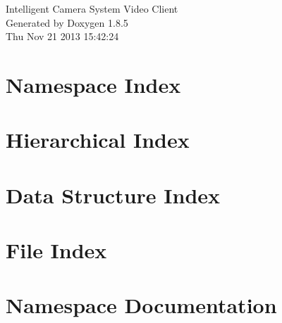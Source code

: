 \documentclass[twoside]{book}
\newcommand{\clearemptydoublepage}{%
  \newpage{\pagestyle{empty}\cleardoublepage}%
}
\begin{document}
\hypersetup{pageanchor=false}
\begin{titlepage}
\vspace*{7cm}
\begin{center}%
{\Large Intelligent Camera System Video Client }\\
\vspace*{1cm}
{\large Generated by Doxygen 1.8.5}\\
\vspace*{0.5cm}
{\small Thu Nov 21 2013 15:42:24}\\
\end{center}
\end{titlepage}
\clearemptydoublepage
\tableofcontents
\clearemptydoublepage
{}
\hypersetup{pageanchor=true}

\chapter{Namespace Index}

\chapter{Hierarchical Index}

\chapter{Data Structure Index}

\chapter{File Index}

\chapter{Namespace Documentation}



\end{document}
